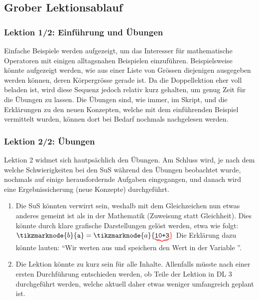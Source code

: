 \begin{myExBox}[title=DL \themycounter]
\subsection*{Grober Lektionsablauf}
\subsubsection*{Lektion 1/2: Einführung und Übungen}
Einfache Beispiele werden aufgezeigt, um das Interesser für mathematische Operatoren mit einigen alltagsnahen Beispielen einzuführen. Beispielsweise könnte aufgezeigt werden, wie aus einer Liste von Grössen diejenigen ausgegeben werden können, deren Körpergrösse gerade ist. Da die Doppellektion eher voll beladen ist, wird diese Sequenz jedoch relativ kurz gehalten, um genug Zeit für die Übungen zu lassen. Die Übungen sind, wie immer, im Skript, und die Erklärungen zu den neuen Konzepten, welche mit dem einführenden Beispiel vermittelt wurden, können dort bei Bedarf nochmals nachgelesen werden.

\subsubsection*{Lektion 2/2: Übungen}
Lektion 2 widmet sich hautpsächlich den Übungen. Am Schluss wird, je nach dem welche Schwierigkeiten bei den SuS während den Übungen beobachtet wurde, nochmals auf einige herausfordernde Aufgaben eingegangen, und danach wird eine Ergebnissicherung (neue Konzepte) durchgeführt.

\begin{myExBox}[title=Mögliche Schwierigkeiten \& geeignete Massnahmen]
\begin{enumerate}
    \item Die SuS könnten verwirrt sein, weshalb mit dem Gleichzeichen nun etwas anderes gemeint ist als in der Mathematik (Zuweisung statt Gleichheit). Dies könnte durch klare grafische Darstellungen gelöst werden, etwa wie folgt: $  \tikzmarknode{b}{\text{\texttt{a}}} =\tikzmarknode{a}{\color{red}\underbrace{\color{black}\text{\texttt{10+3}}}}
        $
	Die Erklärung dazu könnte lauten: ``Wir werten  aus und speichern den Wert  in der Variable ''.
	\item Die Lektion könnte zu kurz sein für alle Inhalte. Allenfalls müsste nach einer ersten Durchführung entschieden werden, ob Teile der Lektion in DL 3 durchgeführt werden, welche aktuell daher etwas weniger umfangreich geplant ist.
\end{enumerate}
\end{myExBox}
\end{myExBox}
\newpage{}

